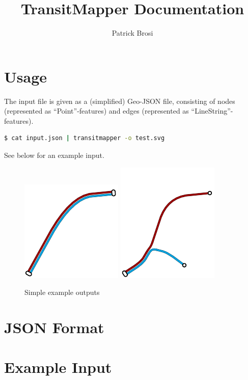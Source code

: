 \documentclass[10pt,a4paper]{article}
\title{TransitMapper Documentation}
\author{Patrick Brosi}
\begin{document}
\maketitle

\section{Usage}

The input file is given as a (simplified) Geo-JSON file, consisting of nodes (represented as ``Point''-features) and edges (represented as ``LineString''-features).

\begin{lstlisting}[language=bash,firstnumber=1]
$ cat input.json | transitmapper -o test.svg
\end{lstlisting}

See below for an example input.

\begin{figure}[htbp]
  \centering
  \includegraphics{test.pdf}
  \includegraphics{test2.pdf}
  \caption{Simple example outputs}
\end{figure}

\section{JSON Format}

\section{Example Input}
\end{document}
